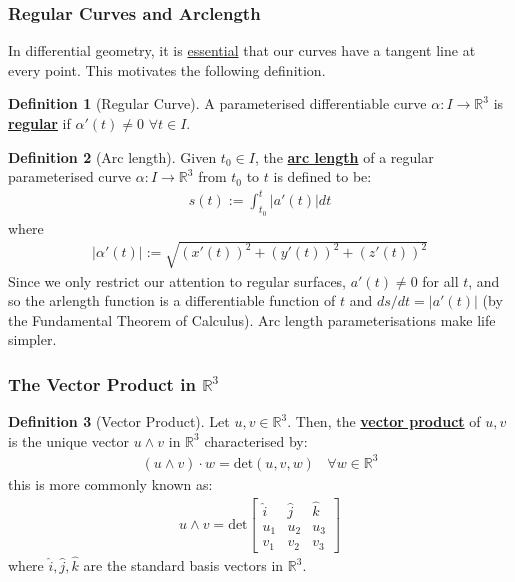 \documentclass[11pt]{scrartcl}
\newcommand{\R}[0]{\mathbb{R}}
\theoremstyle{definition}
\newtheorem{definition}{Definition}
\theoremstyle{remark}
\newcommand{\dfn}[1]{\textbf{\underline{#1}}}
\newcommand{\idx}[2]{\int_{#1}^{#2}}
\begin{document}
\subsubsection{Regular Curves and Arclength}
In differential geometry, it is \underline{essential} that our curves have a tangent line at every point. This motivates the following definition. 

\begin{definition}[Regular Curve]
	A parameterised differentiable curve $\alpha: I \rightarrow \R^3$ is \dfn{regular} if $\alpha' (t) \neq 0$ $\forall t \in I$. 
\end{definition}

\begin{definition}[Arc length]
	Given $t_0 \in I$, the \dfn{arc length} of a regular parameterised curve $\alpha: I \rightarrow \R^3$ from $t_0$ to $t$ is defined to be: 
	\begin{align*}
		s(t) := \idx{t_0}{t} | a'(t) | dt 
	\end{align*}
	where
	\begin{align*}
		| \alpha' (t) | := \sqrt{(x'(t))^2 + (y'(t))^2 + (z'(t))^2}
	\end{align*}
	Since we only restrict our attention to regular surfaces, $a'(t) \neq 0$ for all $t$, and so the arlength function is a differentiable function of $t$ and $ds/dt = |a'(t)|$ (by the Fundamental Theorem of Calculus). Arc length parameterisations make life simpler. 
\end{definition}

\subsubsection{The Vector Product in $\R^3$}

\begin{definition}[Vector Product]
	Let $u,v \in \R^3$. Then, the \dfn{vector product} of $u,v$ is the unique vector $u \wedge v$ in $\R^3$ characterised by: 
	\begin{align*}
		(u \wedge v) \cdot w = \text{det}(u,v,w)\ \text{  } \forall w \in \R^3
	\end{align*}
	this is more commonly known as:
	\begin{align*}
		u \wedge v = \text{det} \begin{bmatrix}
			\hat{i} & \hat{j} & \hat{k} \\
			u_1 & u_2 & u_3 \\
			v_1 & v_2 & v_3 
		\end{bmatrix}
	\end{align*}
	where $\hat{i}, \hat{j}, \hat{k}$ are the standard basis vectors in $\R^3$. 
\end{definition}
\end{document}
